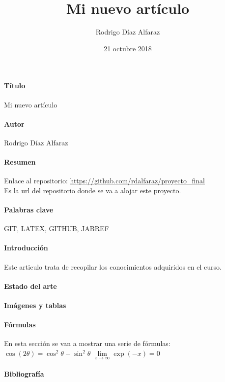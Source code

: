 \documentclass[a4paper,11pt]{article}
\begin{document}
\title{Mi nuevo artículo} 
\author{Rodrigo Díaz Alfaraz}
\date{21 octubre 2018}
\maketitle

\paragraph*{Título}
Mi nuevo artículo

\paragraph*{Autor}
Rodrigo Díaz Alfaraz

\paragraph*{Resumen}  Enlace al repositorio:
\linebreak
\url{https://github.com/rdalfaraz/proyecto_final} \\Es la url del repositorio donde se va a alojar este proyecto.
\paragraph*{Palabras clave}

GIT, LATEX, GITHUB, JABREF

\paragraph*{Introducción}
Este articulo trata de recopilar los conocimientos adquiridos en el curso. 

\paragraph*{Estado del arte}
\paragraph*{Imágenes y tablas}
\paragraph*{Fórmulas}
En esta sección se van a mostrar una serie de fórmulas:
$\cos (2\theta) = \cos^2 \theta - \sin^2 \theta$
\linebreak
\linebreak
\linebreak
$\lim\limits_{x \to \infty} \exp(-x) = 0$

\paragraph*{Bibliografía}
\end{document}
